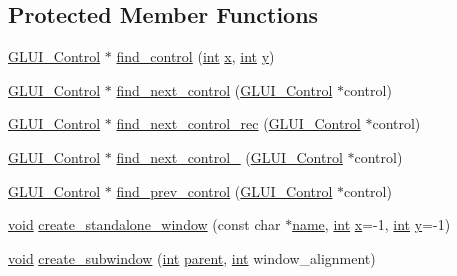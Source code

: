 \subsection*{Protected Member Functions}
\begin{DoxyCompactItemize}
\item 
\hyperlink{class_g_l_u_i___control}{G\+L\+U\+I\+\_\+\+Control} $\ast$ \hyperlink{class_g_l_u_i___main_a8bb9bc693db0b65cf06a6b3caf5bf467}{find\+\_\+control} (\hyperlink{wglext_8h_a500a82aecba06f4550f6849b8099ca21}{int} \hyperlink{glext_8h_ad77deca22f617d3f0e0eb786445689fc}{x}, \hyperlink{wglext_8h_a500a82aecba06f4550f6849b8099ca21}{int} \hyperlink{glext_8h_a9298c7ad619074f5285b32c6b72bfdea}{y})
\item 
\hyperlink{class_g_l_u_i___control}{G\+L\+U\+I\+\_\+\+Control} $\ast$ \hyperlink{class_g_l_u_i___main_af869103edb803d7f65d94e1be9b5071f}{find\+\_\+next\+\_\+control} (\hyperlink{class_g_l_u_i___control}{G\+L\+U\+I\+\_\+\+Control} $\ast$control)
\item 
\hyperlink{class_g_l_u_i___control}{G\+L\+U\+I\+\_\+\+Control} $\ast$ \hyperlink{class_g_l_u_i___main_a701cf2655bcccf2b7c5fa4e7fac83b8b}{find\+\_\+next\+\_\+control\+\_\+rec} (\hyperlink{class_g_l_u_i___control}{G\+L\+U\+I\+\_\+\+Control} $\ast$control)
\item 
\hyperlink{class_g_l_u_i___control}{G\+L\+U\+I\+\_\+\+Control} $\ast$ \hyperlink{class_g_l_u_i___main_a88940d2937c251aad1526e1884ef7f7f}{find\+\_\+next\+\_\+control\+\_\+} (\hyperlink{class_g_l_u_i___control}{G\+L\+U\+I\+\_\+\+Control} $\ast$control)
\item 
\hyperlink{class_g_l_u_i___control}{G\+L\+U\+I\+\_\+\+Control} $\ast$ \hyperlink{class_g_l_u_i___main_a8817c8356985d9f508eabf33721cdebe}{find\+\_\+prev\+\_\+control} (\hyperlink{class_g_l_u_i___control}{G\+L\+U\+I\+\_\+\+Control} $\ast$control)
\item 
\hyperlink{wglext_8h_a9e6b7f1933461ef318bb000d6bd13b83}{void} \hyperlink{class_g_l_u_i___main_a524a3d3e51e01707a6fe1916bfdd4e1f}{create\+\_\+standalone\+\_\+window} (const char $\ast$\hyperlink{glext_8h_ad977737dfc9a274a62741b9500c49a32}{name}, \hyperlink{wglext_8h_a500a82aecba06f4550f6849b8099ca21}{int} \hyperlink{glext_8h_ad77deca22f617d3f0e0eb786445689fc}{x}=-\/1, \hyperlink{wglext_8h_a500a82aecba06f4550f6849b8099ca21}{int} \hyperlink{glext_8h_a9298c7ad619074f5285b32c6b72bfdea}{y}=-\/1)
\item 
\hyperlink{wglext_8h_a9e6b7f1933461ef318bb000d6bd13b83}{void} \hyperlink{class_g_l_u_i___main_a4a05365e245aa1751f5b828bdbd78b0e}{create\+\_\+subwindow} (\hyperlink{wglext_8h_a500a82aecba06f4550f6849b8099ca21}{int} \hyperlink{class_g_l_u_i___node_a8ed65d447784f6f88bd3e2e2bcac6cdb}{parent}, \hyperlink{wglext_8h_a500a82aecba06f4550f6849b8099ca21}{int} window\+\_\+alignment)

\end{DoxyCompactItemize}
